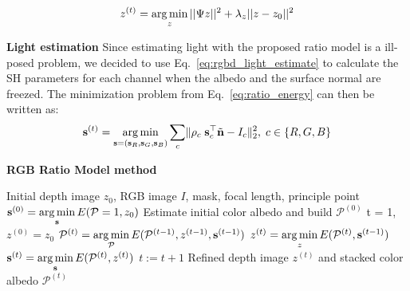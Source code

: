 \begin{equation}\label{eq:ratio_depth_refine}
    z^{(t)}= \operatorname*{arg\,min}_{z}  ||\Psi z||^2 + \lambda_z||z - z_0||^2
\end{equation}

\textbf{Light estimation}
Since estimating light with the proposed ratio model is a ill-posed problem, we decided to use Eq.~\ref{eq:rgbd_light_estimate} to calculate the SH parameters for each channel when the albedo and the surface normal are freezed. The minimization problem from Eq.~\ref{eq:ratio_energy} can then be written as:
\begin{equation}\label{eq:ratio_light_estimate}
    \mathbf{s}^{(t)} = \operatorname*{arg\,min}_{\mathbf{s} = (\mathbf{s}_R, \mathbf{s}_G, \mathbf{s}_B)}\sum_{c} \lVert \rho_c \; \mathbf{s}_c^\top \tilde{\mathbf{n}} - I_c\rVert^2_2, \; c\in\{R,G,B\}
\end{equation}

\begin{algorithm}[!htbp]
	\begin{algorithmic}[1]
  		\caption{\textbf{RGB Ratio Model method}}
		\label{alg:rgb_ratio}
		 \renewcommand{\algorithmicrequire}{\textbf{Input:}}
		 \renewcommand{\algorithmicensure}{\textbf{Output:}}
		 \REQUIRE Initial depth image $z_0$, RGB image $I$, mask, focal length, principle point
		 \vspace{1.8mm}
		 \STATE $\mathbf{s}^{(0)} = \operatorname*{arg\,min} \limits_{\mathbf{s}} E(\mathcal{P} =1, z_0)$ 
		 \STATE Estimate initial color albedo and build $\mathcal{P}^{(0)}$  
		 \STATE t = 1, $z^{(0)} = z_0$
		 \vspace{1.8mm}
		   \vspace{1.8mm}
			\STATE $\mathcal{P}^{(t)} = \operatorname*{arg\,min} \limits_{\mathcal{P}} E(\mathcal{P}^{(t-1)}, z^{(t-1)}, \mathbf{s}^{(t-1)})$ 
			  \STATE $z^{(t)} = \operatorname*{arg\,min} \limits_{z} E(\mathcal{P}^{(t)}, \mathbf{s}^{(t-1)})$ 
			  \STATE $\mathbf{s}^{(t)} = \operatorname*{arg\,min} \limits_{\mathbf{s}} E(\mathcal{P}^{(t)}, z^{(t)})$ 
			  \vspace{1.8mm}
		          \STATE $t := t + 1$
		 \vspace{1.8mm}
		  \ENDWHILE
		  \ENSURE  Refined depth image $z^{(t)}$ and stacked color albedo $\mathcal{P}^{(t)}$
	\end{algorithmic}
\end{algorithm}

